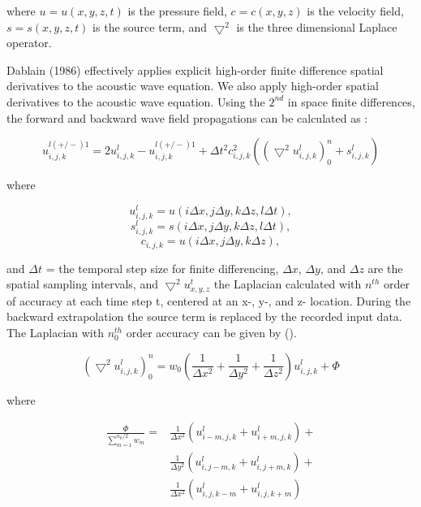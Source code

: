 where \( u = u(x, y, z, t) \) is the pressure field, \(c = c(x, y, z) \) is
the velocity field, \( s = s(x, y, z, t) \) is the source term, and \(
\bigtriangledown ^2 \) is the three dimensional Laplace operator.

Dablain (1986) effectively applies explicit high-order finite
difference spatial derivatives to the acoustic wave equation.
We also apply high-order spatial derivatives to the acoustic
wave equation. Using the \( 2^{nd} \) in space finite differences, the
forward and backward wave field propagations can be calculated as
\cite{rtm_psdm}:

\begin{equation}
  u ^{l(+/-)1} _{i,j,k} = 2u^l _{i,j,k} - u^{l(+/-)1} _{i,j,k} + \Delta t^2
  c^2 _{i,j,k} (\left( \bigtriangledown ^2 u ^l _{i,j,k}  \right) ^ n_0 +
  s ^l _{i,j,k})
\end{equation}

where

\[u^l _{i,j,k} = u(i\Delta x, j \Delta y, k \Delta z, l \Delta t),\]
\[ s^l _{i,j,k} = s(i\Delta x, j \Delta y, k \Delta z, l \Delta t),\]
\[ c_{i,j,k} = u(i\Delta x, j \Delta y, k \Delta z), \]

and \( \Delta t \) =  the temporal step size for finite differencing, \(
\Delta x \), \( \Delta y \), and \( \Delta z \) are the spatial sampling
intervals, and \( \bigtriangledown ^2 u^t _{x, y, z} \) the Laplacian
calculated with \( n^{th} \) order of accuracy at each time step t, centered at an x-, y-, and z- location. During the backward extrapolation the source
term is replaced by the recorded input data. The Laplacian with
\( n^{th} _0 \) order accuracy can be given by ().

\begin{equation}
  (\bigtriangledown ^2 u ^l _{i,j,k})^n_0 = w_0(\frac{1}{\Delta x^2} +
  \frac{1}{\Delta y^2} + \frac{1}{\Delta z^2})u^l _{i, j, k} + \Phi
\end{equation}

where

\begin{equation}
  \begin{split}
    \frac{\Phi}{\sum_{m=1} ^{n_0 / 2}w_m} =
      &\frac{1}{\Delta x^2}\left(u^l _{i-m, j, k}+ u ^l _{i+m, j, k} 
      \right) + \\
      &\frac{1}{\Delta y^2}\left(u^l _{i, j-m, k}+ u ^l _{i, j+m, k} 
      \right) + \\
      &\frac{1}{\Delta x^2}\left(u^l _{i, j, k-m}+ u ^l _{i, j, k+m} \right)
  \end{split}
\end{equation}


